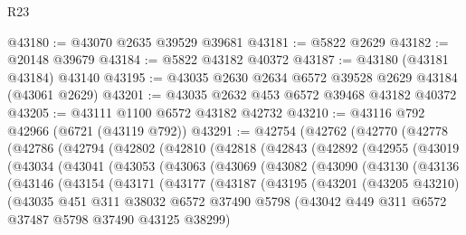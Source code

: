 \begin{lexlean}{R23}
\begin{coremodule}
@43180 := @43070 @2635 @39529 @39681
@43181 := @5822 @2629
@43182 := @20148 @39679
@43184 := @5822 @43182 @40372
@43187 := @43180 (@43181 @43184) @43140
@43195 := @43035 @2630 @2634 @6572 @39528 @2629 @43184 (@43061 @2629)
@43201 := @43035 @2632 @453 @6572 @39468 @43182 @40372
@43205 := @43111 @1100 @6572 @43182 @42732
@43210 := @43116 @792 @42966 (@6721 (@43119 @792))
@43291 := @42754
    (@42762
      (@42770
        (@42778
          (@42786
            (@42794
              (@42802
                (@42810
                  (@42818
                    (@42843
                      (@42892
                        (@42955
                          (@43019
                            (@43034
                              (@43041
                                (@43053
                                  (@43063
                                    (@43069
                                      (@43082
                                        (@43090
                                          (@43130
                                            (@43136
                                              (@43146
                                                (@43154
                                                  (@43171
                                                    (@43177
                                                      (@43187
                                                        (@43195
                                                          (@43201
                                                            (@43205 @43210)
                                                            (@43035
                                                              @451
                                                              @311
                                                              @38032
                                                              @6572
                                                              @37490
                                                              @5798
                                                              (@43042
                                                                @449
                                                                @311
                                                                @6572
                                                                @37487
                                                                @5798
                                                                @37490
                                                                @43125
                                                                @38299)

\end{coremodule}
\end{lexlean}
